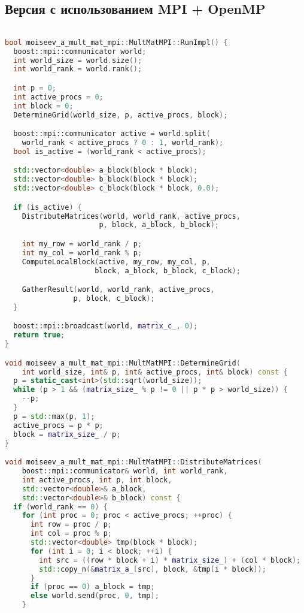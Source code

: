 \documentclass[14pt,a4paper]{extarticle}
\begin{document}
\subsection{Версия с использованием MPI + OpenMP}
\begin{lstlisting}[frame=single,language=C++,basicstyle=\small]

bool moiseev_a_mult_mat_mpi::MultMatMPI::RunImpl() {
  boost::mpi::communicator world;
  int world_size = world.size();
  int world_rank = world.rank();

  int p = 0;
  int active_procs = 0;
  int block = 0;
  DetermineGrid(world_size, p, active_procs, block);

  boost::mpi::communicator active = world.split(
    world_rank < active_procs ? 0 : 1, world_rank);
  bool is_active = (world_rank < active_procs);

  std::vector<double> a_block(block * block);
  std::vector<double> b_block(block * block);
  std::vector<double> c_block(block * block, 0.0);

  if (is_active) {
    DistributeMatrices(world, world_rank, active_procs, 
                      p, block, a_block, b_block);

    int my_row = world_rank / p;
    int my_col = world_rank % p;
    ComputeLocalBlock(active, my_row, my_col, p, 
                     block, a_block, b_block, c_block);

    GatherResult(world, world_rank, active_procs, 
                p, block, c_block);
  }

  boost::mpi::broadcast(world, matrix_c_, 0);
  return true;
}

void moiseev_a_mult_mat_mpi::MultMatMPI::DetermineGrid(
    int world_size, int& p, int& active_procs, int& block) const {
  p = static_cast<int>(std::sqrt(world_size));
  while (p > 1 && (matrix_size_ % p != 0 || p * p > world_size)) {
    --p;
  }
  p = std::max(p, 1);
  active_procs = p * p;
  block = matrix_size_ / p;
}

void moiseev_a_mult_mat_mpi::MultMatMPI::DistributeMatrices(
    boost::mpi::communicator& world, int world_rank,
    int active_procs, int p, int block,
    std::vector<double>& a_block,
    std::vector<double>& b_block) const {
  if (world_rank == 0) {
    for (int proc = 0; proc < active_procs; ++proc) {
      int row = proc / p;
      int col = proc % p;
      std::vector<double> tmp(block * block);
      for (int i = 0; i < block; ++i) {
        int src = ((row * block + i) * matrix_size_) + (col * block);
        std::copy_n(&matrix_a_[src], block, &tmp[i * block]);
      }
      if (proc == 0) a_block = tmp;
      else world.send(proc, 0, tmp);
    }
    

\end{lstlisting}
\end{document}

